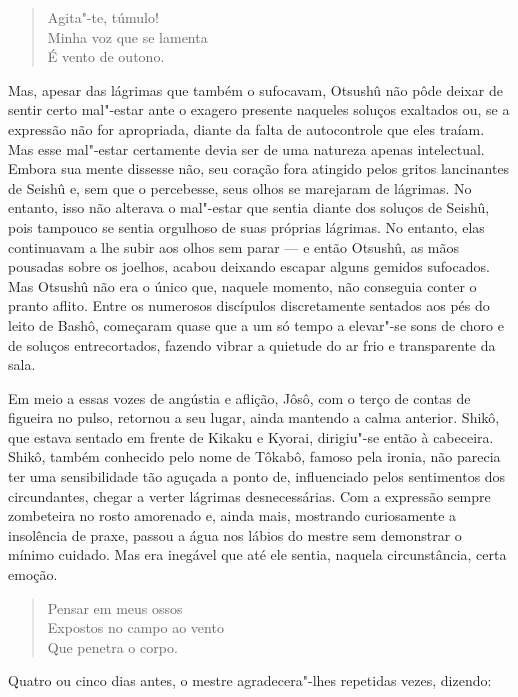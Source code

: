 \begin{verse}
Agita"-te, túmulo!\\
Minha voz que se lamenta\\
É vento de outono.
\end{verse}

Mas, apesar das lágrimas que também o sufocavam, Otsushû não pôde deixar
de sentir certo mal"-estar ante o exagero presente naqueles soluços
exaltados ou, se a expressão não for apropriada, diante da falta de
autocontrole que eles traíam. Mas esse mal"-estar certamente devia ser
de uma natureza apenas intelectual. Embora sua mente dissesse não, seu
coração fora atingido pelos gritos lancinantes de Seishû e, sem que o
percebesse, seus olhos se marejaram de lágrimas. No entanto, isso não
alterava o mal"-estar que sentia diante dos soluços de Seishû, pois
tampouco se sentia orgulhoso de suas próprias lágrimas. No entanto,
elas continuavam a lhe subir aos olhos sem parar --- e então Otsushû, as
mãos pousadas sobre os joelhos, acabou deixando escapar alguns gemidos
sufocados. Mas Otsushû não era o único que, naquele momento, não
conseguia conter o pranto aflito. Entre os numerosos discípulos
discretamente sentados aos pés do leito de Bashô, começaram quase que a
um só tempo a elevar"-se sons de choro e de soluços entrecortados,
fazendo vibrar a quietude do ar frio e transparente da sala.

Em meio a essas vozes de angústia e aflição, Jôsô, com o terço de contas
de figueira no pulso, retornou a seu lugar, ainda mantendo a calma
anterior. Shikô, que estava sentado em frente de Kikaku e Kyorai,
dirigiu"-se então à cabeceira. Shikô, também conhecido pelo nome de
Tôkabô, famoso pela ironia, não parecia ter uma sensibilidade tão
aguçada a ponto de, influenciado pelos sentimentos dos circundantes,
chegar a verter lágrimas desnecessárias. Com a expressão sempre zombeteira 
no rosto amorenado e, ainda mais, mostrando
curiosamente a insolência de praxe, passou a água nos lábios do mestre
sem demonstrar o mínimo cuidado. Mas era inegável que até ele sentia,
naquela circunstância, certa emoção.
 
\begin{verse}
Pensar em meus ossos\\
Expostos no campo ao vento\\
Que penetra o corpo.
\end{verse}

Quatro ou cinco dias antes, o mestre agradecera"-lhes repetidas vezes, dizendo:

